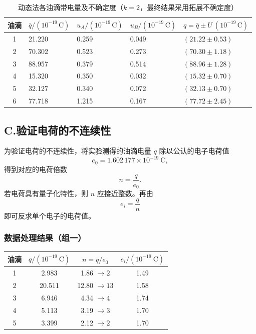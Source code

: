 \documentclass[a4paper,8pt,twocolumn]{article}
\begin{document}
\begin{table}[H]
\centering
\caption{动态法各油滴带电量及不确定度（$k=2$，最终结果采用拓展不确定度）}
\begin{tabularx}{\linewidth}{c *{4}{Y}}
\hline
油滴 &
$\bar q /(10^{-19}\,\mathrm{C})$ &
$u_A /(10^{-19}\,\mathrm{C})$ &
$u_B /(10^{-19}\,\mathrm{C})$ &
$q = \bar q \pm U\ (10^{-19}\,\mathrm{C})$ \\
 & 21.220 & 0.259 & 0.049 & $(21.22 \pm 0.53)$ \\
2 & 70.302 & 0.523 & 0.273 & $(70.30 \pm 1.18)$ \\
3 & 88.957 & 0.379 & 0.514 & $(88.96 \pm 1.28)$ \\
4 & 15.320 & 0.350 & 0.032 & $(15.32 \pm 0.70)$ \\
5 & 32.127 & 0.340 & 0.072 & $(32.13 \pm 0.70)$ \\
6 & 77.718 & 1.215 & 0.167 & $(77.72 \pm 2.45)$ \\
\hline
\end{tabularx}
\end{table}

\subsection*{C.\;验证电荷的不连续性}

为验证电荷的不连续性，将实验测得的油滴电量 $q$ 除以公认的电子电荷值
\[
e_0 = 1.602\,177 \times 10^{-19}\ \mathrm{C},
\]
得到对应的电荷倍数
\[
n = \frac{q}{e_0}.
\]
若电荷具有量子化特性，则 $n$ 应接近整数。再由
\[
e_i = \frac{q}{n}
\]
即可反求单个电子的电荷值。

\subsubsection*{数据处理结果（组一）}

\begin{table}[H]
\centering
\begin{tabular}{c c c c}
\hline
油滴 & $q/(10^{-19}\ \mathrm{C})$ & $n = q/e_0$ & $e_i/(10^{-19}\ \mathrm{C})$ \\
\hline
1 & 2.983  & 1.86 $\rightarrow 2$  & 1.49 \\
2 & 20.511 & 12.80 $\rightarrow 13$ & 1.58 \\
3 & 6.946  & 4.34 $\rightarrow 4$  & 1.74 \\
4 & 5.113  & 3.19 $\rightarrow 3$  & 1.70 \\
5 & 3.399  & 2.12 $\rightarrow 2$  & 1.70 \\
\hline
\end{tabular}
\end{table}
\end{document}
